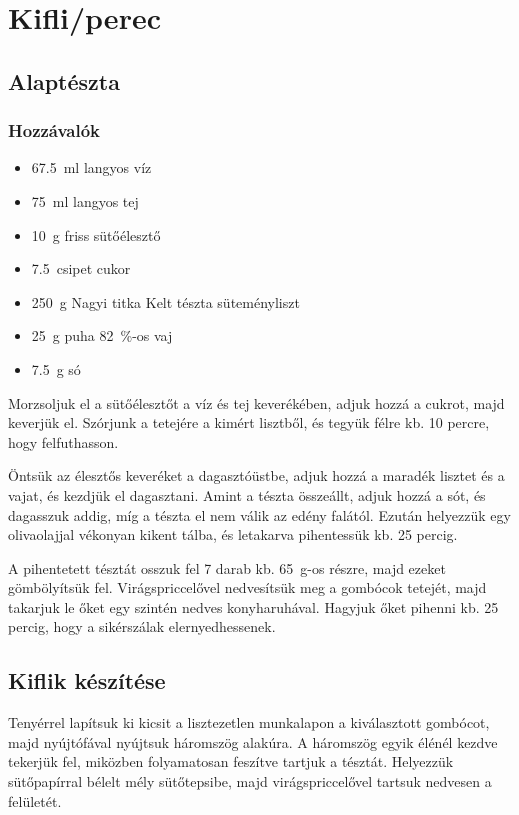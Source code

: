 \newpage
\section*{Kifli/perec}

\subsection*{Alaptészta}
\subsubsection*{Hozzávalók}
\begin{itemize}
    \item \qty{67.5}{\ml} langyos víz
    \item \qty{75}{\ml} langyos tej
    \item \qty{10}{\g} friss sütőélesztő
    \item \qty{7.5}{csipet} cukor
    \item \qty{250}{\g} Nagyi titka Kelt tészta süteményliszt
    \item \qty{25}{\g} puha \qty{82}{\percent}-os vaj
    \item \qty{7.5}{\g} só
\end{itemize}

Morzsoljuk el a sütőélesztőt a víz és tej keverékében, adjuk hozzá a cukrot, majd keverjük el. Szórjunk a tetejére a kimért lisztből, és tegyük félre kb. \num{10} percre, hogy felfuthasson.

Öntsük az élesztős keveréket a dagasztóüstbe, adjuk hozzá a maradék lisztet és a vajat, és kezdjük el dagasztani. Amint a tészta összeállt, adjuk hozzá a sót, és dagasszuk addig, míg a tészta el nem válik az edény falától. Ezután helyezzük egy olivaolajjal vékonyan kikent tálba, és letakarva pihentessük kb. \num{25} percig.

A pihentetett tésztát osszuk fel \num{7} darab kb. \qty{65}{\g}-os részre, majd ezeket gömbölyítsük fel. Virágspriccelővel nedvesítsük meg a gombócok tetejét, majd takarjuk le őket egy szintén nedves konyharuhával. Hagyjuk őket pihenni kb. \num{25} percig, hogy a sikérszálak elernyedhessenek.~\cite{szabi_kifli}

\subsection*{Kiflik készítése}
Tenyérrel lapítsuk ki kicsit a lisztezetlen munkalapon a kiválasztott gombócot, majd nyújtófával nyújtsuk háromszög alakúra. A háromszög egyik élénél kezdve tekerjük fel, miközben folyamatosan feszítve tartjuk a tésztát. Helyezzük sütőpapírral bélelt mély sütőtepsibe, majd virágspriccelővel tartsuk nedvesen a felületét.

